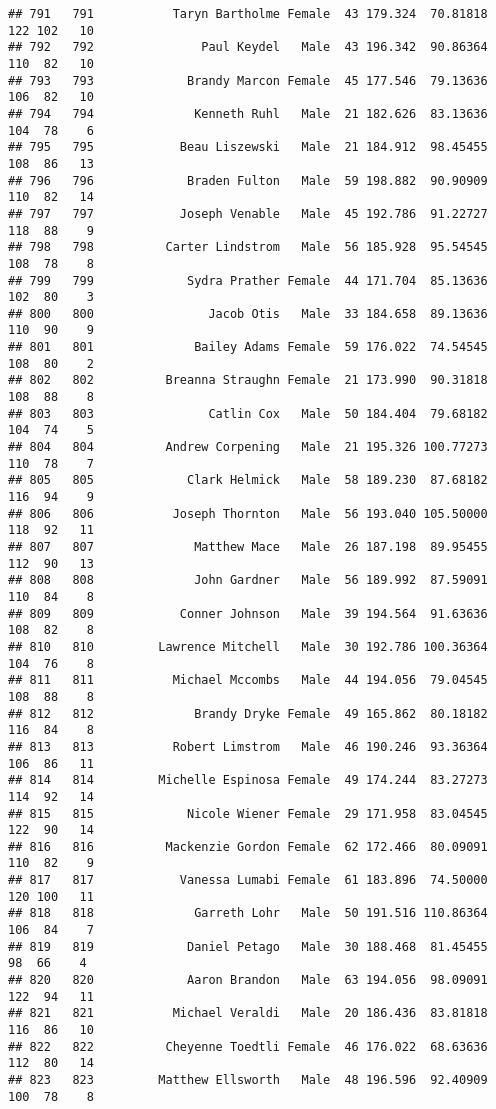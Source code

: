 \documentclass[
]{article}
\begin{document}
\begin{verbatim}
## 791   791           Taryn Bartholme Female  43 179.324  70.81818 122 102   10
## 792   792               Paul Keydel   Male  43 196.342  90.86364 110  82   10
## 793   793             Brandy Marcon Female  45 177.546  79.13636 106  82   10
## 794   794              Kenneth Ruhl   Male  21 182.626  83.13636 104  78    6
## 795   795            Beau Liszewski   Male  21 184.912  98.45455 108  86   13
## 796   796             Braden Fulton   Male  59 198.882  90.90909 110  82   14
## 797   797            Joseph Venable   Male  45 192.786  91.22727 118  88    9
## 798   798          Carter Lindstrom   Male  56 185.928  95.54545 108  78    8
## 799   799             Sydra Prather Female  44 171.704  85.13636 102  80    3
## 800   800                Jacob Otis   Male  33 184.658  89.13636 110  90    9
## 801   801              Bailey Adams Female  59 176.022  74.54545 108  80    2
## 802   802          Breanna Straughn Female  21 173.990  90.31818 108  88    8
## 803   803                Catlin Cox   Male  50 184.404  79.68182 104  74    5
## 804   804          Andrew Corpening   Male  21 195.326 100.77273 110  78    7
## 805   805             Clark Helmick   Male  58 189.230  87.68182 116  94    9
## 806   806           Joseph Thornton   Male  56 193.040 105.50000 118  92   11
## 807   807              Matthew Mace   Male  26 187.198  89.95455 112  90   13
## 808   808              John Gardner   Male  56 189.992  87.59091 110  84    8
## 809   809            Conner Johnson   Male  39 194.564  91.63636 108  82    8
## 810   810         Lawrence Mitchell   Male  30 192.786 100.36364 104  76    8
## 811   811           Michael Mccombs   Male  44 194.056  79.04545 108  88    8
## 812   812              Brandy Dryke Female  49 165.862  80.18182 116  84    8
## 813   813           Robert Limstrom   Male  46 190.246  93.36364 106  86   11
## 814   814         Michelle Espinosa Female  49 174.244  83.27273 114  92   14
## 815   815             Nicole Wiener Female  29 171.958  83.04545 122  90   14
## 816   816          Mackenzie Gordon Female  62 172.466  80.09091 110  82    9
## 817   817            Vanessa Lumabi Female  61 183.896  74.50000 120 100   11
## 818   818              Garreth Lohr   Male  50 191.516 110.86364 106  84    7
## 819   819             Daniel Petago   Male  30 188.468  81.45455  98  66    4
## 820   820             Aaron Brandon   Male  63 194.056  98.09091 122  94   11
## 821   821           Michael Veraldi   Male  20 186.436  83.81818 116  86   10
## 822   822          Cheyenne Toedtli Female  46 176.022  68.63636 112  80   14
## 823   823         Matthew Ellsworth   Male  48 196.596  92.40909 100  78    8

\end{verbatim}
\end{document}
